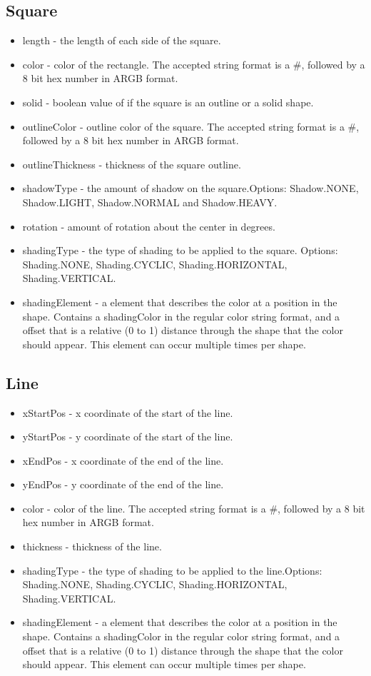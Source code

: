 \documentclass{article}
\begin{document}
\subsection{Square}
\begin{itemize}
\item length - the length of each side of the square.
\item color - color of the rectangle. The accepted string format is a \#, followed by a 8 bit hex number in ARGB format.
\item solid - boolean value of if the square is an outline or a solid shape.
\item outlineColor - outline color of the square. The accepted string format is a \#, followed by a 8 bit hex number in ARGB format.
\item outlineThickness - thickness of the square outline.
\item shadowType - the amount of shadow on the square.\newline  Options: Shadow.NONE, Shadow.LIGHT, Shadow.NORMAL and Shadow.HEAVY.
\item rotation - amount of rotation about the center in degrees. 
\item shadingType - the type of shading to be applied to the square. \newline  Options: Shading.NONE, Shading.CYCLIC, Shading.HORIZONTAL, Shading.VERTICAL.
\item shadingElement - a element that describes the color at a position in the shape. Contains a shadingColor in the regular color string format, and a offset that is a relative (0 to 1) distance through the shape that the color should appear. This element can occur multiple times per shape.
\end{itemize}

\subsection{Line}
\begin{itemize}
\item xStartPos - x coordinate of the start of the line.
\item yStartPos - y coordinate of the start of the line.
\item xEndPos - x coordinate of the end of the line.
\item yEndPos - y coordinate of the end of the line.
\item color - color of the line. The accepted string format is a \#, followed by a 8 bit hex number in ARGB format.
\item thickness - thickness of the line.
\item shadingType - the type of shading to be applied to the line.\newline  Options: Shading.NONE, Shading.CYCLIC, Shading.HORIZONTAL, Shading.VERTICAL.
\item shadingElement - a element that describes the color at a position in the shape. Contains a shadingColor in the regular color string format, and a offset that is a relative (0 to 1) distance through the shape that the color should appear. This element can occur multiple times per shape.
\end{itemize}
\end{document}
